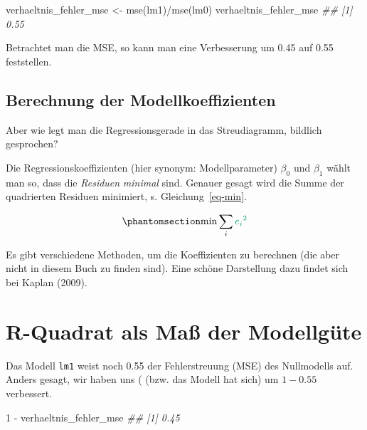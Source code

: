\documentclass[
  letterpaper,
  oneside,
  open=any]{scrbook}
\newenvironment{Shaded}{\begin{snugshade}}{\end{snugshade}}
\newcommand{\DecValTok}[1]{\textcolor[rgb]{0.68,0.00,0.00}{#1}}
\newcommand{\DocumentationTok}[1]{\textcolor[rgb]{0.37,0.37,0.37}{\textit{#1}}}
\newcommand{\FunctionTok}[1]{\textcolor[rgb]{0.28,0.35,0.67}{#1}}
\newcommand{\NormalTok}[1]{\textcolor[rgb]{0.00,0.23,0.31}{#1}}
\newcommand{\OtherTok}[1]{\textcolor[rgb]{0.00,0.23,0.31}{#1}}
\newcommand{\SpecialCharTok}[1]{\textcolor[rgb]{0.37,0.37,0.37}{#1}}
\theoremstyle{definition}
\theoremstyle{definition}
\theoremstyle{definition}
\theoremstyle{remark}
\begin{document}
\begin{Shaded}
\begin{Highlighting}[]
\NormalTok{verhaeltnis\_fehler\_mse }\OtherTok{\textless{}{-}} \FunctionTok{mse}\NormalTok{(lm1)}\SpecialCharTok{/}\FunctionTok{mse}\NormalTok{(lm0)}
\NormalTok{verhaeltnis\_fehler\_mse}
\DocumentationTok{\#\# [1] 0.55}
\end{Highlighting}
\end{Shaded}

Betrachtet man die MSE, so kann man eine Verbesserung um 0.45 auf 0.55
feststellen.

\subsection{Berechnung der
Modellkoeffizienten}\label{berechnung-der-modellkoeffizienten}

Aber wie legt man die Regressionsgerade in das Streudiagramm, bildlich
gesprochen?

Die Regressionskoeffizienten (hier synonym: Modellparameter) \(\beta_0\)
und \(\beta_1\) wählt man so, dass die \emph{Residuen} \emph{minimal}
sind. Genauer gesagt wird die Summe der quadrierten {Residuen}
minimiert, s. Gleichung~\ref{eq-min}.

\begin{equation}\phantomsection\label{eq-min}{\text{min}\sum_i \color{errorcol}{e_i}^2}\end{equation}

Es gibt verschiedene Methoden, um die Koeffizienten zu berechnen (die
aber nicht in diesem Buch zu finden sind). Eine schöne Darstellung dazu
findet sich bei Kaplan (2009).

\section{R-Quadrat als Maß der
Modellgüte}\label{r-quadrat-als-mauxdf-der-modellguxfcte}

Das Modell \texttt{lm1} weist noch 0.55 der Fehlerstreuung (MSE) des
Nullmodells auf. Anders gesagt, wir haben uns ( (bzw. das Modell hat
sich) um \(1 - 0.55\) verbessert.

\begin{Shaded}
\begin{Highlighting}[]
\DecValTok{1} \SpecialCharTok{{-}}\NormalTok{ verhaeltnis\_fehler\_mse}
\DocumentationTok{\#\# [1] 0.45}
\end{Highlighting}
\end{Shaded}
\end{document}

